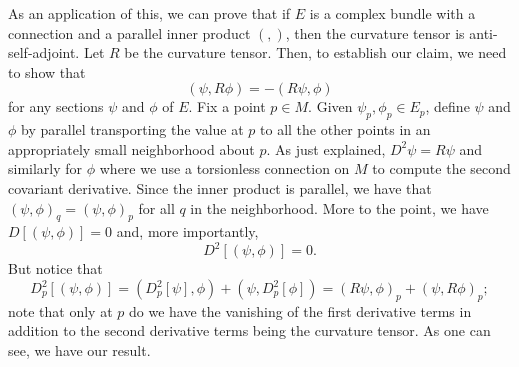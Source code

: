 \documentclass[11pt]{article}
\theoremstyle{remark}
\begin{document}
As an application of this, we can prove that if $E$ is a complex
bundle with a connection and a parallel inner product $\ensuremath{({}, {})}$,
then the curvature tensor is anti-self-adjoint. Let $R$ be the
curvature tensor. Then, to establish our claim, we need to show that 
\[
\ensuremath{({\ensuremath{\psi}}, {R\phi})} = - \ensuremath{({R \ensuremath{\psi}}, {\phi})}
\]
for any sections $\ensuremath{\psi}$ and $\phi$ of $E$. Fix a point $p \in M$. 
Given $\ensuremath{\psi}_p, \phi_p \in
E_p$, define $\ensuremath{\psi}$ and $ \phi$  by parallel transporting the value at
$p$ to all the other points in an appropriately small neighborhood
about $p$. As just explained, $D^2 \ensuremath{\psi} = R\ensuremath{\psi}$ and similarly for
$\phi$ where we use a torsionless connection on $M$ to compute the
second covariant derivative. Since the inner product is parallel, we
have that $\ensuremath{({\ensuremath{\psi}}, {\phi})}_q = \ensuremath{({\ensuremath{\psi}}, {\phi})}_p$ for all $q$ in the
neighborhood. More to the point, we have $D[\ensuremath{({\ensuremath{\psi}}, {\phi})}] =0$ and,
more importantly, 
\[
D^2 [\ensuremath{({\ensuremath{\psi}}, {\phi})}] = 0.
\]
But notice that 
\[
D^2_p[\ensuremath{({\ensuremath{\psi}}, {\phi})}] = \ensuremath{({D_p^2[\ensuremath{\psi}]}, {\phi})} + \ensuremath{({\ensuremath{\psi}}, {D_p^2[\phi]})}
= \ensuremath{({R \ensuremath{\psi}}, {\phi})}_p + \ensuremath{({\ensuremath{\psi}}, {R\phi})}_p;
\]
note that only at $p$ do we have the vanishing of the first derivative
terms in addition to the second derivative terms being the curvature tensor. 
As one can see, we have our result.

\clearpage


\end{document}
